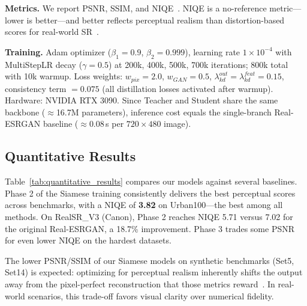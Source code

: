 \documentclass[runningheads]{llncs}
\begin{document}
\noindent\textbf{Metrics.} We report PSNR, SSIM, and NIQE~\cite{mittal2012making}. NIQE is a no-reference metric—lower is better—and better reflects perceptual realism than distortion-based scores for real-world SR~\cite{wang2021realesrgan}.

\noindent\textbf{Training.} Adam optimizer ($\beta_1=0.9$, $\beta_2=0.999$), learning rate $1\times10^{-4}$ with MultiStepLR decay ($\gamma=0.5$) at 200k, 400k, 500k, 700k iterations; 800k total with 10k warmup. Loss weights: $w_{pix}=2.0$, $w_{GAN}=0.5$, $\lambda^{out}_{kd}=\lambda^{feat}_{kd}=0.15$, consistency term $=0.075$ (all distillation losses activated after warmup). Hardware: NVIDIA RTX 3090. Since Teacher and Student share the same backbone ($\approx$16.7M parameters), inference cost equals the single-branch Real-ESRGAN baseline ($\approx$0.08\,s per $720\times480$ image).

\subsection{Quantitative Results}

Table~\ref{tab:quantitative_results} compares our models against several baselines. Phase 2 of the Siamese training consistently delivers the best perceptual scores across benchmarks, with a NIQE of \textbf{3.82} on Urban100—the best among all methods. On RealSR\_V3 (Canon), Phase 2 reaches NIQE 5.71 versus 7.02 for the original Real-ESRGAN, a 18.7\% improvement. Phase 3 trades some PSNR for even lower NIQE on the hardest datasets.

The lower PSNR/SSIM of our Siamese models on synthetic benchmarks (Set5, Set14) is expected: optimizing for perceptual realism inherently shifts the output away from the pixel-perfect reconstruction that those metrics reward~\cite{blau2018perception}. In real-world scenarios, this trade-off favors visual clarity over numerical fidelity.
\end{document}
